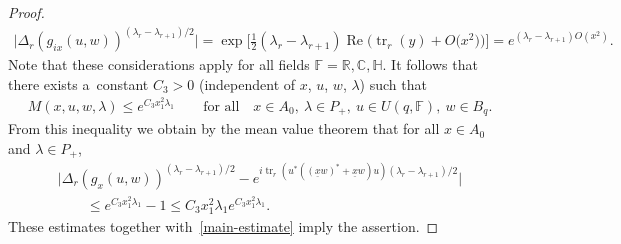 \documentclass[11pt]{article}
\numberwithin{equation}{section}
\DeclareMathOperator{\Ree}{Re}
\begin{document}
\begin{proof}
\begin{gather*}
\big|\Delta_r(g_{ix}(u,w))^{(\lambda_r-\lambda_{r+1})/2}\big|=\exp\big[\tfrac 12 (\lambda_r-\lambda_{r+1})
 \Ree\big(\operatorname{tr}_r(y)+ O\big(x^2\big)\big)\big]=e^{(\lambda_r -\lambda_{r+1}) O(x^2)}.
\end{gather*}
Note that these considerations apply for all f\/ields $\mathbb F=\mathbb R, \mathbb C, \mathbb H$. It follows that there
exists a~constant $C_3>0$ (independent of $x$, $u$, $w$, $\lambda$) such that
\begin{gather*}
M(x,u,w,\lambda)\le e^{C_3x_1^2\lambda_1}
\qquad
\text{for all}
\quad
x\in A_0, \  \lambda\in P_+,  \ u\in U(q, \mathbb F), \ w \in B_q.
\end{gather*}
From this inequality we obtain by the mean value theorem that for all $x\in A_0$ and $\lambda\in P_+$,
\begin{gather*}
\big|  \Delta_r(g_{x}(u,w))^{(\lambda_r-\lambda_{r+1})/2}- e^{i \operatorname{tr}_r(u^*((\underline x w)^*+ \underline x w)u)
 (\lambda_r-\lambda_{r+1})/2}\big|
\\
\qquad{}
 \leq e^{C_3x_1^2\lambda_1}-1 \leq C_3 x_1^2\lambda_1 e^{C_3x_1^2\lambda_1}.
\end{gather*}
These estimates together with~\eqref{main-estimate} imply the assertion.
\end{proof}
\end{document}
